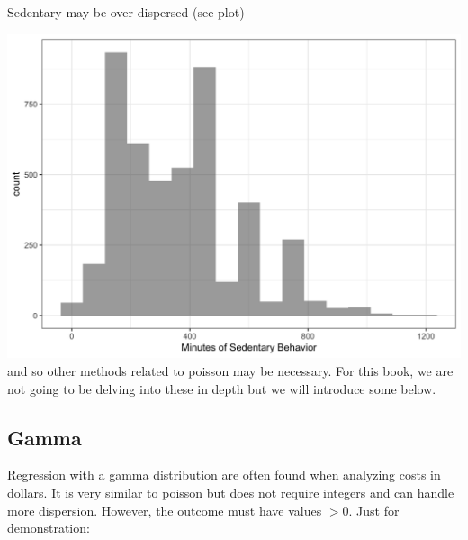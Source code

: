 \documentclass[]{tufte-book}
\newenvironment{Shaded}{}{}
\newcommand{\KeywordTok}[1]{\textcolor[rgb]{0.00,0.44,0.13}{\textbf{#1}}}
\newcommand{\DataTypeTok}[1]{\textcolor[rgb]{0.56,0.13,0.00}{#1}}
\newcommand{\FloatTok}[1]{\textcolor[rgb]{0.25,0.63,0.44}{#1}}
\newcommand{\StringTok}[1]{\textcolor[rgb]{0.25,0.44,0.63}{#1}}
\newcommand{\OperatorTok}[1]{\textcolor[rgb]{0.40,0.40,0.40}{#1}}
\newcommand{\NormalTok}[1]{#1}
\theoremstyle{definition}
\theoremstyle{definition}
\theoremstyle{remark}
\begin{document}
Sedentary may be over-dispersed (see plot)

\includegraphics{_main_files/figure-latex/unnamed-chunk-86-1} and so
other methods related to poisson may be necessary. For this book, we are
not going to be delving into these in depth but we will introduce some
below.

\subsection*{Gamma}\label{gamma}

Regression with a gamma distribution are often found when analyzing
costs in dollars. It is very similar to poisson but does not require
integers and can handle more dispersion. However, the outcome must have
values \(> 0\). Just for demonstration:

\begin{Shaded}
\end{Shaded}
\end{document}
